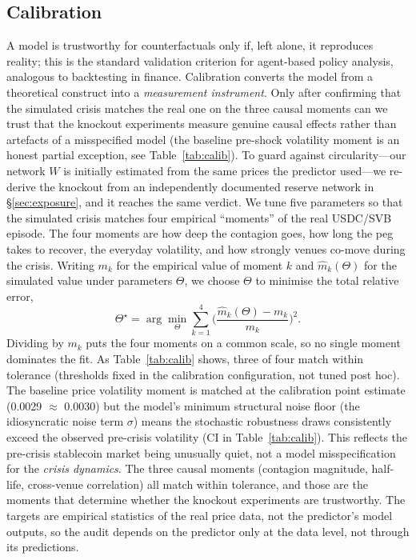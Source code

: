 \documentclass[sigconf,anonymous]{acmart}
\begin{document}
\subsection{Calibration}
A model is trustworthy for counterfactuals only if, left alone, it reproduces
reality; this is the standard validation criterion for agent-based policy analysis,
analogous to backtesting in finance. Calibration converts the model from a theoretical
construct into a \emph{measurement instrument}. Only after confirming that the simulated crisis matches the real one
on the three causal moments can we trust that the knockout experiments measure genuine
causal effects rather than artefacts of a misspecified model (the baseline pre-shock
volatility moment is an honest partial exception, see Table~\ref{tab:calib}). To guard
against circularity---our network $W$ is initially estimated from the same prices the
predictor used---we re-derive the knockout from an independently documented reserve network
in \S\ref{sec:exposure}, and it reaches the same verdict.
We tune five
parameters so that the simulated crisis matches four empirical ``moments'' of the real USDC/SVB
episode. The four moments are how deep the contagion goes, how long the peg takes to recover, the
everyday volatility, and how strongly venues co-move during the crisis. Writing $m_k$ for the
empirical value of moment $k$ and $\hat m_k(\Theta)$ for the simulated value under parameters
$\Theta$, we choose $\Theta$ to minimise the total relative error,
\begin{equation}
\Theta^\star=\arg\min_{\Theta}\sum_{k=1}^{4}\Big(\frac{\hat m_k(\Theta)-m_k}{m_k}\Big)^2 .
\end{equation}
Dividing by $m_k$ puts the four moments on a common scale, so no single moment dominates the fit. As
Table~\ref{tab:calib} shows, three of four match within tolerance (thresholds fixed in the
calibration configuration, not tuned post hoc). The baseline price volatility
moment is matched at the calibration point estimate (0.0029 $\approx$ 0.0030) but the model's
minimum structural noise floor (the idiosyncratic noise term $\sigma$) means the stochastic
robustness draws consistently exceed the observed pre-crisis volatility (CI in
Table~\ref{tab:calib}). This reflects the pre-crisis stablecoin
market being unusually quiet, not a model misspecification for the \emph{crisis dynamics}. The
three causal moments (contagion magnitude, half-life, cross-venue correlation) all match within
tolerance, and those are the moments that determine whether the knockout experiments are trustworthy.
The targets are empirical statistics of the real
price data, not the predictor's model outputs, so the audit depends on the predictor only at the data level, not
through its predictions.
\end{document}
